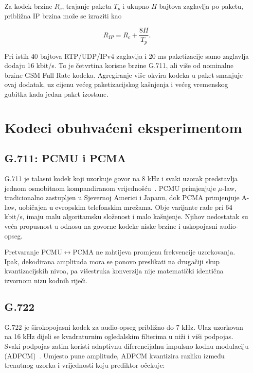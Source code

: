 Za kodek brzine $R_c$, trajanje paketa $T_p$ i ukupno $H$ bajtova zaglavlja po paketu, približna IP brzina može se izraziti kao

\begin{equation}
R_{IP}=R_c+\frac{8H}{T_p}.
\end{equation}

Pri istih 40 bajtova RTP/UDP/IPv4 zaglavlja i 20 ms paketizacije samo zaglavlja dodaju 16 kbit/s. To je četvrtina korisne brzine G.711, ali više od nominalne brzine GSM Full Rate kodeka. Agregiranje više okvira kodeka u paket smanjuje ovaj dodatak, uz cijenu većeg paketizacijskog kašnjenja i većeg vremenskog gubitka kada jedan paket izostane.

\section{Kodeci obuhvaćeni eksperimentom}

\subsection{G.711: PCMU i PCMA}

G.711 je talasni kodek koji uzorkuje govor na 8 kHz i svaki uzorak predstavlja jednom osmobitnom kompandiranom vrijednošću~\cite{g711}. PCMU primjenjuje $\mu$-law, tradicionalno zastupljen u Sjevernoj Americi i Japanu, dok PCMA primjenjuje A-law, uobičajen u evropskim telefonskim mrežama. Obje varijante rade pri 64 kbit/s, imaju malu algoritamsku složenost i malo kašnjenje. Njihov nedostatak su veća propusnost u odnosu na govorne kodeke niske brzine i uskopojasni audio-opseg.

Pretvaranje PCMU$\leftrightarrow$PCMA ne zahtijeva promjenu frekvencije uzorkovanja. Ipak, dekodirana amplituda mora se ponovo preslikati na drugačiji skup kvantizacijskih nivoa, pa višestruka konverzija nije matematički identična izvornom nizu kodnih riječi.

\subsection{G.722}

G.722 je širokopojasni kodek za audio-opseg približno do 7 kHz. Ulaz uzorkovan na 16 kHz dijeli se kvadraturnim ogledalskim filterima u niži i viši podpojas. Svaki podpojas zatim koristi adaptivnu diferencijalnu impulsno-kodnu modulaciju (ADPCM)~\cite{g722}. Umjesto pune amplitude, ADPCM kvantizira razliku između trenutnog uzorka i vrijednosti koju prediktor očekuje:

